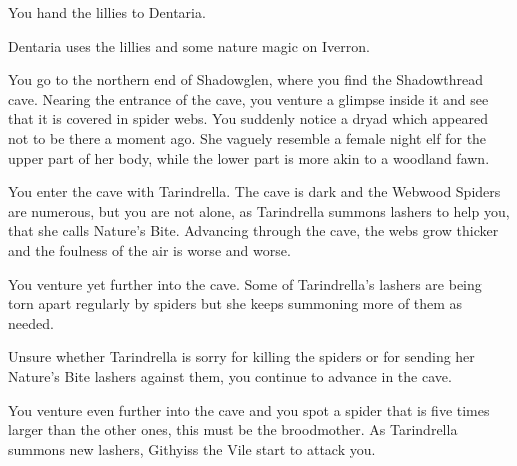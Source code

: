 
You hand the lillies to Dentaria.


Dentaria uses the lillies and some nature magic on Iverron.



You go to the northern end of Shadowglen, where you find the Shadowthread cave. Nearing the entrance of the cave, you venture a glimpse inside it and see that it is covered in spider webs. You suddenly notice a dryad which appeared not to be there a moment ago. She vaguely resemble a female night elf for the upper part of her body, while the lower part is more akin to a woodland fawn.




You enter the cave with Tarindrella. The cave is dark and the Webwood Spiders are numerous, but you are not alone, as Tarindrella summons lashers to help you, that she calls Nature's Bite. Advancing through the cave, the webs grow thicker and the foulness of the air is worse and worse. %


You venture yet further into the cave. Some of Tarindrella's lashers are being torn apart regularly by spiders but she keeps summoning more of them as needed.


Unsure whether Tarindrella is sorry for killing the spiders or for sending her Nature's Bite lashers against them, you continue to advance in the cave.




You venture even further into the cave and you spot a spider that is five times larger than the other ones, this must be the broodmother. As Tarindrella summons new lashers, Githyiss the Vile start to attack you.

